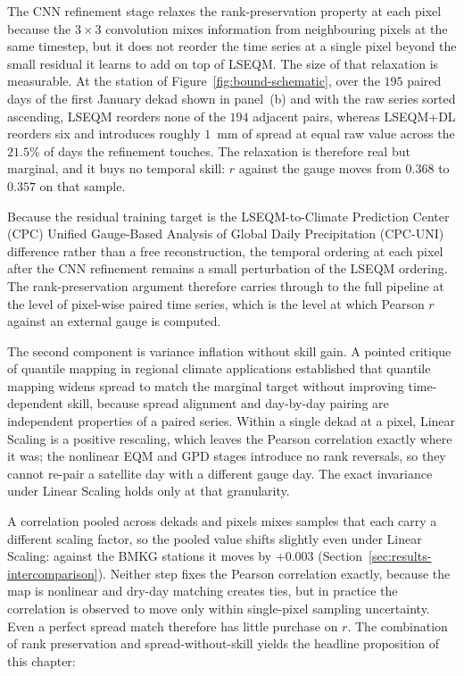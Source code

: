 The CNN
refinement stage relaxes the rank-preservation property at
each pixel because the $3 \times 3$ convolution mixes information
from neighbouring pixels at the same timestep, but it does not
reorder the time series at a single pixel beyond the small
residual it learns to add on top of LSEQM. The size of that
relaxation is measurable. At the station of
Figure~\ref{fig:bound-schematic}, over the $195$ paired days of the
first January dekad shown in panel~(b) and with the raw series
sorted ascending, LSEQM reorders none of the $194$ adjacent pairs,
whereas LSEQM+DL
reorders six and introduces roughly $1$~mm of spread at equal raw
value across the $21.5\%$ of days the refinement touches. The
relaxation is therefore real but marginal, and it buys no temporal
skill: $r$ against the gauge moves from $0.368$ to $0.357$ on that
sample.

Because the residual
training target is the LSEQM-to-Climate Prediction Center (CPC) Unified Gauge-Based Analysis of Global Daily Precipitation (CPC-UNI) difference rather than
a free reconstruction, the temporal ordering at each pixel after
the CNN refinement remains a small perturbation of the LSEQM
ordering. The rank-preservation argument therefore carries through
to the full pipeline at the level of pixel-wise paired time series,
which is the level at which Pearson $r$ against an external gauge
is computed.

The second component is variance inflation without skill gain.
A pointed critique of quantile mapping in regional climate
applications \citep{ref:maraun2013} established that quantile
mapping widens spread to match the marginal target without
improving time-dependent skill, because spread alignment and
day-by-day pairing are independent properties of a paired
series. Within a single dekad at a pixel, Linear Scaling is a
positive rescaling, which leaves the Pearson correlation exactly
where it was; the nonlinear EQM and GPD stages introduce no rank
reversals, so they cannot re-pair a satellite day with a different
gauge day. The exact invariance under Linear Scaling holds only at
that granularity.

A correlation pooled across dekads and pixels
mixes samples that each carry a different scaling factor, so the
pooled value shifts slightly even under Linear Scaling: against the
BMKG stations it moves by $+0.003$
(Section~\ref{sec:results-intercomparison}).
Neither step fixes the Pearson correlation exactly, because the map
is nonlinear and dry-day matching creates ties, but in practice the
correlation is observed to move only within single-pixel sampling
uncertainty. Even a perfect spread match therefore has little
purchase on $r$. The combination of rank
preservation and spread-without-skill yields the headline
proposition of this chapter:

